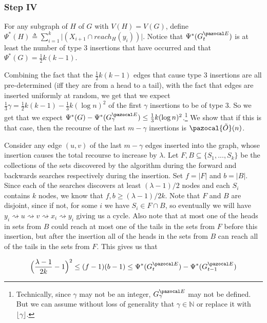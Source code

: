 \documentclass{report}
\begin{document}
\subsubsection{Step IV}

For any subgraph of $H$ of $G$ with $V(H)=V(G)$, define $\Psi^{*}(H) \triangleq \sum_{i=1}^{k} \vert (X_{i+1} \cap reach_{H}(y_{i})) \vert$. Notice that $\Psi^{*}(G_{t}^{\pazocal E})$ is at least the number of type 3 insertions that have occurred and that $\Psi^{*}(G) = \frac{1}{2}k(k-1)$.

Combining the fact that the $\frac{1}{2}k(k-1)$ edges that cause type 3 insertions are all pre-determined (iff they are from a head to a tail), with the fact that edges are inserted uniformly at random, we get that we expect $\frac{1}{3}\gamma = \frac{1}{2}k(k-1) - \frac{1}{3}k(\log n)^2$ of the first $\gamma$ insertions to be of type 3. So we get that we expect $\Psi^{*}(G)-\Psi^{*}(G_{\gamma}^{\pazocal E}) \leq \frac{1}{3}k(\log n)^2$.\footnote{Technically, since $\gamma$ may not be an integer, $G_{\gamma}^{\pazocal E}$ may not be defined. But we can assume without loss of generality that $\gamma \in \mathbb N$ or replace it with $\lfloor \gamma \rfloor$.} We show that if this is that case, then the recourse of the last $m-\gamma$ insertions is $\pazocal{\tilde{O}}(n)$.

Consider any edge $(u,v)$ of the last $m - \gamma$ edges inserted into the graph, whose insertion causes the total recourse to increase by $\lambda$. Let $F,B \subseteq \{S_{1},...,S_{k}\}$ be the collections of the sets discovered by the algorithm during the forward and backwards searches respectively during the insertion. Set $f = \vert F \vert$ and $b = \vert B \vert$. Since each of the searches discovers at least $(\lambda-1)/2$ nodes and each $S_{i}$ contains $k$ nodes, we know that $f, b \geq (\lambda-1)/2k$. Note that $F$ and $B$ are disjoint, since if not, for some $i$ we have $S_{i} \in F \cap B$, so eventually we will have $y_{i} \rightsquigarrow u \rightsquigarrow v \rightsquigarrow x_{i} \rightsquigarrow y_{i}$ giving us a cycle. Also note that at most one of the heads in sets from $B$ could reach at most one of the tails in the sets from $F$ before this insertion, but after the insertion all of the heads in the sets from $B$ can reach all of the tails in the sets from $F$. This gives us that

\[ \Big (\frac{\lambda - 1}{2k} - 1 \Big )^2 \leq (f-1)(b-1) \leq \Psi^*(G^{\pazocal E}_t) - \Psi^*(G^{\pazocal E}_{t-1}) \]
\end{document}
